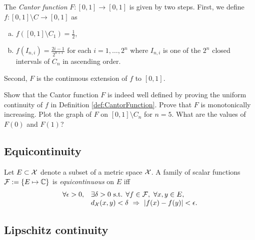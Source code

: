 \begin{defn}
  \label{def:CantorFunction}
  The \emph{Cantor function} $F:[0,1]\rightarrow[0,1]$
  is given by two steps.
  First, we define $f:[0,1]\setminus C \rightarrow[0,1]$
  as
  \begin{enumerate}[(a)]\itemsep0em
  \item %
    $f([0,1]\setminus C_1)=\frac{1}{2}$,
  \item $f(I_{n,i})=\frac{2i-1}{2^{n+1}}$
    for each $i=1,\ldots,2^n$
    where $I_{n,i}$ is one of the $2^{n}$ closed intervals
    of $C_n$ in ascending order.
  \end{enumerate}
  Second, $F$ is the continuous extension of $f$
  to $[0,1]$. 
\end{defn}

\begin{exc}
  \label{exc:CantorFuncWellDefined}
  Show that the Cantor function $F$
  is indeed well defined
  by proving the uniform continuity
  of $f$ in Definition \ref{def:CantorFunction}.
  Prove that $F$ is monotonically increasing.
  Plot the graph of $F$
  on $[0,1]\setminus C_n$ for $n=5$. 
  What are the values of $F(0)$ and $F(1)$?
\end{exc}

\subsection{Equicontinuity}

\begin{defn}
  \label{def:equcontinuity}
  Let $E\subset{\cal X}$ denote a subset
  of a metric space ${\cal X}$.
  A family of scalar functions
  ${\cal F}:=\{E\mapsto \mathbb{C}\}$
  is \emph{equicontinuous} on $E$
  iff
  \begin{equation}
    \label{eq:equcontinuity}
    \begin{array}{{rl}}
    \forall \epsilon>0, &\exists \delta>0 \text{ s.t. }
    \forall f\in{\cal F},\ \forall x,y\in E,\ \\
      &d_{\cal X}(x,y)<\delta\ \Rightarrow\ |f(x)-f(y)|<\epsilon.
    \end{array}
  \end{equation}
\end{defn}

\subsection{Lipschitz continuity}
\label{sec:lipschitz-continuity}


